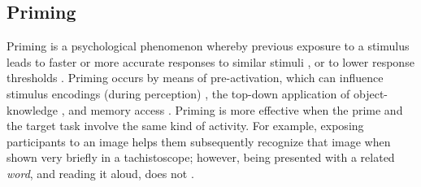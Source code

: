 \documentclass{sigchi}
\begin{document}
%
%
%


\subsection{Priming}
Priming is a psychological phenomenon whereby previous exposure to a 
stimulus leads to faster or more accurate responses to similar stimuli 
\cite{Ghuman17062008},
or to lower response thresholds \cite{BJOP1826}.  
Priming occurs by means of pre-activation, which can influence
stimulus encodings (during perception) \cite{BJOP1826}, 
the top-down application of object-knowledge \cite{Ghuman17062008},
and memory access \cite{beller1971priming}.
Priming is more 
effective when the prime and the target task involve the same kind of 
activity.  For example, exposing participants to an image helps them 
subsequently recognize that image when shown very briefly in a 
tachistoscope; however, being presented with a related \textit{word}, 
and reading it aloud, does not \cite{BJOP1796}.
\end{document}
